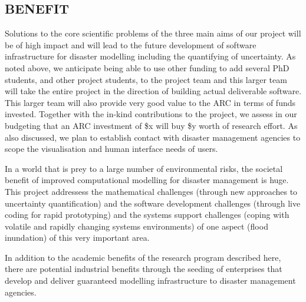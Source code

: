 \subsection*{BENEFIT}


Solutions to the core scientific problems of the three main aims of our project will be of high impact and will lead to the future development of  software infrastructure for disaster modelling including the quantifying of uncertainty. As noted above, we anticipate being able to use other funding to add several PhD students, and other project students, to the project team and this larger team will take the entire project in the direction of building actual deliverable software. This larger team will also provide very good value to the ARC in terms of funds invested. Together with the in-kind contributions to the project, we assess in our budgeting that an ARC investment of \$x will buy \$y worth of research effort.
  As also discussed, we plan to establish contact with disaster management agencies to scope the visualisation and human interface needs of users. 

In a world that is prey to a large number of environmental risks,
the societal benefit of improved computational modelling for disaster management is huge.
This project addressess the mathematical challenges (through new approaches
to uncertainty quantification) and the software development challenges (through live coding
 for rapid prototyping) and the systems support challenges (coping with volatile and 
 rapidly changing systems environments) of one aspect (flood inundation) of this very important area.
 
In addition to the academic benefits of the research program described here, there are potential industrial benefits
through the seeding of enterprises that develop and deliver guaranteed modelling infrastructure to disaster management
agencies.

\iffalse
This research is aims to unlock the power of sophisticated
computational simulation incorporating uncertainty for
\emph{interactive} use.  Although we concentrate our research on
simulation support for disaster response, the ultimate potential of
this work is to eventually empower domain experts from a broad range
of areas to better use the high-performance computing power which is
now available to them. We envision a future where performing a complex
flood model or disaster simulation is as interactive and \emph{alive}
as flicking through photos on a tablet.\\



There are several benefits arising from the successful completion of
this project. They include, economic, societal as well as
environmental along with the generation of new knowledge:
\begin{itemize}
\item Reduced economic losses from disasters such as flooding
\item Reduced property damage from disasters
\item Reduced loss of life from disasters
\item New knowledge in the understanding of disaster modelling, and
  hence forecasting.
\end{itemize}
\fi